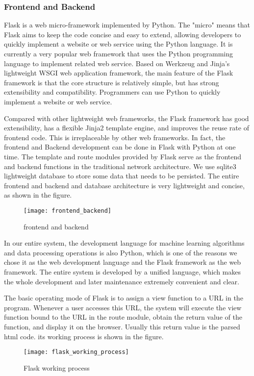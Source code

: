 \subsubsection{Frontend and Backend}
Flask is a web micro-framework implemented by Python. The "micro" means that Flask aims to keep the code concise and easy to extend, allowing developers to quickly implement a website or web service using the Python language. It is currently a very popular web framework that uses the Python programming language to implement related web service. Based on Werkzeug and Jinja's lightweight WSGI web application framework, the main feature of the Flask framework is that the core structure is relatively simple, but has strong extensibility and compatibility. Programmers can use Python to quickly implement a website or web service.
\par Compared with other lightweight web frameworks, the Flask framework has good extensibility, has a flexible Jinja2 template engine, and improves the reuse rate of frontend code. This is irreplaceable by other web frameworks. In fact, the frontend and Backend development can be done in Flask with Python at one time. The template and route modules provided by Flask serve as the frontend and backend functions in the traditional network architecture. We use sqlite3 lightweight database to store some data that needs to be persisted. The entire frontend and backend and database architecture is very lightweight and concise, as shown in the figure.
\begin{figure}[h]
\caption{frontend and backend}
\centering
\texttt{[image: frontend\_backend]}
\end{figure}
\par In our entire system, the development language for machine learning algorithms and data processing operations is also Python, which is one of the reasons we chose it as the web development language and the Flask framework as the web framework. The entire system is developed by a unified language, which makes the whole development and later maintenance extremely convenient and clear.
\par The basic operating mode of Flask is to assign a view function to a URL in the program. Whenever a user accesses this URL, the system will execute the view function bound to the URL in the route module, obtain the return value of the function, and display it on the browser. Usually this return value is the parsed html code. its working process is shown in the figure.
\begin{figure}[h]
\caption{Flask working process}
\centering
\texttt{[image: flask\_working\_process]}
\end{figure}
